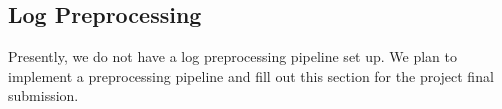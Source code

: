 \documentclass[conference]{IEEEtran}
\begin{document}
\subsection{Log Preprocessing}

Presently, we do not have a log preprocessing pipeline set up. We plan to implement a preprocessing pipeline and fill out this section for the project final submission.






\end{document}
